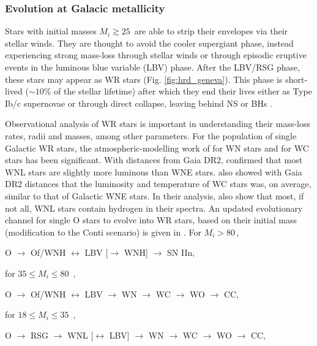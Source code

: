 \subsubsection{Evolution at Galacic metallicity} \label{sect:evo_galactic}

Stars with initial masses $M_i \gtrsim 25\,$\Msun{} are able to strip their envelopes via their stellar winds. They are thought to avoid the cooler supergiant phase, instead experiencing strong mass-loss through stellar winds or through episodic eruptive events in the luminous blue variable (LBV) phase. After the LBV/RSG phase, these stars may appear as WR stars (Fig. \ref{fig:hrd_geneva}). This phase is short-lived (${\sim}10$\% of the stellar lifetime) after which they end their lives either as Type Ib/c supernovae or through direct collapse, leaving behind NS or BHs \citep{heger_how_2003}.

Observational analysis of WR stars is important in understanding their mass-loss rates, radii and masses, among other parameters. For the population of single Galactic WR stars, the atmospheric-modelling work of \citet{hamann_galactic_2019} for WN stars and \citet{sander_galactic_2019} for WC stars has been significant. With distances from Gaia DR2, \citet{hamann_galactic_2019} confirmed that most WNL stars are slightly more luminous than WNE stars. \citet{sander_galactic_2019} also showed with Gaia DR2 distances that the luminosity and temperature of WC stars was, on average, similar to that of Galactic WNE stars. In their analysis, \citet{hamann_galactic_2019} also show that most, if not all, WNL stars contain hydrogen in their spectra. An updated evolutionary channel for single O stars to evolve into WR stars, based on their initial mass (modification to the Conti scenario) is given in \citet{sander_galactic_2019}. For $M_i > 80\,$\Msun{},

\centerline{O $\longrightarrow$ Of/WNH $\longleftrightarrow$ LBV  [$\longrightarrow$ WNH] $\longrightarrow$ SN IIn,}

for $35 \le M_i \le 80\,$ \Msun{},

\centerline{O $\longrightarrow$ Of/WNH $\longleftrightarrow$ LBV  $\longrightarrow$ WN $\longrightarrow$ WC $\longrightarrow$ WO $\longrightarrow$ CC,}

for $18 \le M_i \le 35\,$ \Msun{},

\centerline{O $\longrightarrow$ RSG $\longrightarrow$ WNL [$\longleftrightarrow$ LBV] $\longrightarrow$ WN $\longrightarrow$ WC $\longrightarrow$ WO $\longrightarrow$ CC,}

